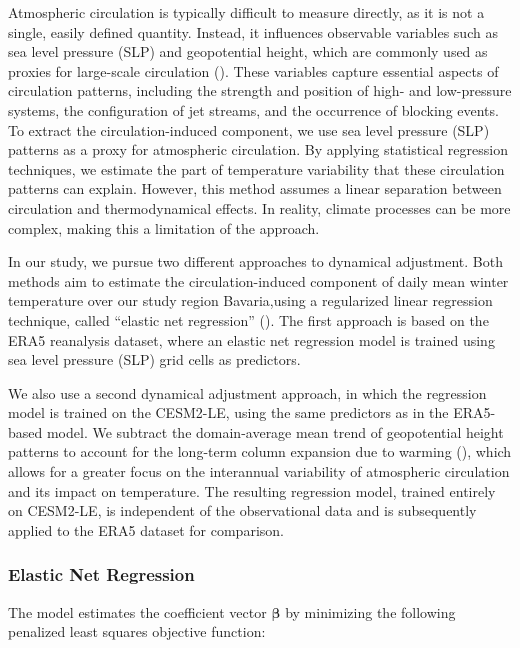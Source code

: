 \documentclass[
]{krantz}
\begin{document}
Atmospheric circulation is typically difficult to measure directly, as it is not a single, easily defined quantity. Instead, it influences observable variables such as sea level pressure (SLP) and geopotential height, which are commonly used as proxies for large-scale circulation (\citep{smoliak2015, sippel2019}). These variables capture essential aspects of circulation patterns, including the strength and position of high- and low-pressure systems, the configuration of jet streams, and the occurrence of blocking events.
To extract the circulation-induced component, we use sea level pressure (SLP) patterns as a proxy for atmospheric circulation. By applying statistical regression techniques, we estimate the part of temperature variability that these circulation patterns can explain. However, this method assumes a linear separation between circulation and thermodynamical effects. In reality, climate processes can be more complex, making this a limitation of the approach.

In our study, we pursue two different approaches to dynamical adjustment. Both methods aim to estimate the circulation-induced component of daily mean winter temperature over our study region Bavaria,using a regularized linear regression technique, called ``elastic net regression'' (\citet{zou2005}). The first approach is based on the ERA5 reanalysis dataset, where an elastic net regression model is trained using sea level pressure (SLP) grid cells as predictors.

We also use a second dynamical adjustment approach, in which the regression model is trained on the CESM2-LE, using the same predictors as in the ERA5-based model. We subtract the domain-average mean trend of geopotential height patterns to account for the long-term column expansion due to warming (\citet{sippel2024}), which allows for a greater focus on the interannual variability of atmospheric circulation and its impact on temperature. The resulting regression model, trained entirely on CESM2-LE, is independent of the observational data and is subsequently applied to the ERA5 dataset for comparison.

\subsubsection{Elastic Net Regression}\label{elastic-net-regression}

The model estimates the coefficient vector \(\boldsymbol{\beta}\) by minimizing the following penalized least squares objective function:
\end{document}

